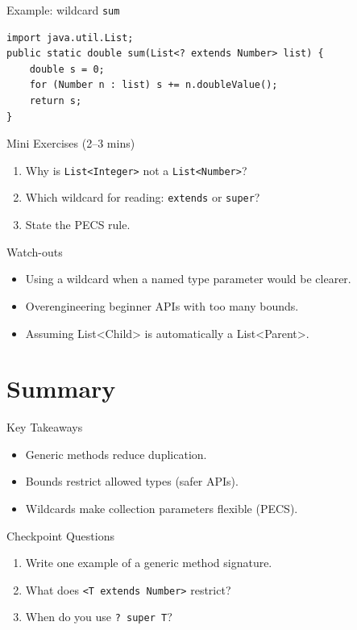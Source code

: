 \documentclass{beamer}
\begin{document}
\begin{frame}[fragile]{Example: wildcard \texttt{sum}}
\begin{lstlisting}
import java.util.List;
public static double sum(List<? extends Number> list) {
    double s = 0;
    for (Number n : list) s += n.doubleValue();
    return s;
}
\end{lstlisting}
  \slidesources{\OOPSUnitIVSources}
\end{frame}

\begin{frame}{Mini Exercises (2--3 mins)}
  \begin{enumerate}[<+->]
    \item Why is \texttt{List<Integer>} not a \texttt{List<Number>}?
    \item Which wildcard for reading: \texttt{extends} or \texttt{super}?
    \item State the PECS rule.
  \end{enumerate}
  \slidesources{\OOPSUnitIVSources}
\end{frame}

\begin{frame}{Watch-outs}
\begin{itemize}[<+->]
  \item Using a wildcard when a named type parameter would be clearer.
  \item Overengineering beginner APIs with too many bounds.
  \item Assuming List<Child> is automatically a List<Parent>.
\end{itemize}
  \slidesources{\OOPSUnitIVSources}
\end{frame}

\section{Summary}
\label{sec:summary}

\begin{frame}{Key Takeaways}
  \begin{itemize}[<+->]
    \item Generic methods reduce duplication.
    \item Bounds restrict allowed types (safer APIs).
    \item Wildcards make collection parameters flexible (PECS).
  \end{itemize}
  \slidesources{\OOPSUnitIVSources}
\end{frame}

\begin{frame}{Checkpoint Questions}
  \begin{enumerate}[<+->]
    \item Write one example of a generic method signature.
    \item What does \texttt{<T extends Number>} restrict?
    \item When do you use \texttt{? super T}?
  \end{enumerate}
  \slidesources{\OOPSUnitIVSources}
\end{frame}
\end{document}
